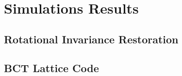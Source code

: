 \pagestyle{myFancy}
\chapter{Simulations Results}

\section{Rotational Invariance Restoration}

\section{BCT Lattice Code}
